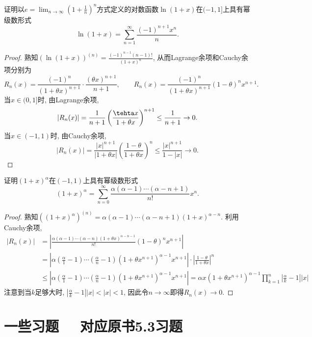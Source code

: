 \begin{example}
	证明以$e=\lim_{n\to \infty} (1+\frac{1}{n})^n$方式定义的对数函数$\ln (1+x)$在$(-1,1]$上具有幂级数形式$$\ln (1+x) = \sum_{n=1}^{\infty} \frac{(-1)^{n+1}x^n}{n}. $$
\end{example}
\begin{proof}
	熟知$(\ln (1+x))^{(n)} = \frac{(-1)^{n-1}(n-1)!}{(1+x)^n}$, 从而Lagrange余项和Cauchy余项分别为$$R_n(x) = \frac{(-1)^n}{(1+\theta x)^{n+1}} \cdot \frac{(\theta x)^{n+1}}{n+1},\qquad R_n(x) = \frac{(-1)^n}{(1+\theta x)^{n+1}} (1-\theta)^nx^{n+1}. $$
	当$x \in (0,1]$时, 由Lagrange余项, $$|R_n(x)| = \frac{1}{n+1} \left( \frac{\tehta x}{1+\theta x} \right)^{n+1} \leq \frac{1}{n+1} \to 0.$$
	当$x \in (-1,1)$时, 由Cauchy余项, $$|R_n(x)| = \frac{|x|^{n+1}}{|1+\theta x|} \left( \frac{1-\theta }{1+\theta x} \right)^n \leq \frac{|x|^{n+1}}{1-|x|} \to 0.$$
\end{proof}

\begin{example}
	证明$(1+x)^{\alpha}$在$(-1,1)$上具有幂级数形式$$(1+x)^{\alpha} = \sum_{n=0}^{\infty} \frac{\alpha (\alpha -1) \cdots (\alpha -n+1)}{n!} x^n. $$
\end{example}
\begin{proof}
	熟知$((1+x)^{\alpha})^{(n)} = \alpha (\alpha -1) \cdots (\alpha -n+1)(1+x)^{\alpha -n}$. 利用Cauchy余项, 
	\begin{align*}
		|R_n(x)| &= \left| \frac{\alpha (\alpha -1) \cdots (\alpha -n)(1+\theta x)^{\alpha -n-1}}{n!} (1-\theta)^n x^{n+1} \right| \\
		&= \left| \alpha \left( \frac{\alpha}{1}-1 \right) \cdots \left( \frac{\alpha}{n}-1 \right) (1+\theta x^{n+1})^{\alpha -1} x^{n+1} \right| \cdot \left| \frac{1-\theta}{1+\theta x} \right|^n \\
		&\leq \left| \alpha \left( \frac{\alpha}{1}-1 \right) \cdots \left( \frac{\alpha}{n}-1 \right) (1+\theta x^{n+1})^{\alpha -1} x^{n+1} \right| = \alpha x (1+\theta x^{n+1})^{\alpha -1} \prod_{k=1}^{n} \left| \frac{\alpha}{k}-1  \right||x|
	\end{align*}
	注意到当$k$足够大时, $|\frac{\alpha}{k}-1||x|<|x|<1$, 因此令$n\to \infty$即得$R_n(x) \to 0$. 
\end{proof}


\newpage
\section*{一些习题 ~~\small 对应原书5.3习题} \label{sec:ex6.2}

